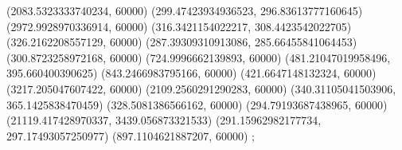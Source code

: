 {(2083.5323333740234, 60000) %
(299.47423934936523, 296.83613777160645) %
(2972.9928970336914, 60000) %
(316.3421154022217, 308.4423542022705) %
(326.2162208557129, 60000) %
(287.39309310913086, 285.66455841064453) %
(300.8723258972168, 60000) %
(724.9996662139893, 60000) %
(481.21047019958496, 395.660400390625) %
(843.2466983795166, 60000) %
(421.6647148132324, 60000) %
(3217.205047607422, 60000) %
(2109.2560291290283, 60000) %
(340.31105041503906, 365.1425838470459) %
(328.5081386566162, 60000) %
(294.79193687438965, 60000) %
(21119.417428970337, 3439.056873321533) %
(291.15962982177734, 297.17493057250977) %
(897.1104621887207, 60000) %
};